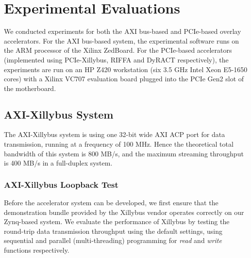 \section{Experimental Evaluations}
We conducted experiments for both the AXI bus-based and PCIe-based overlay accelerators.  
For the AXI bus-based system, the experimental software runs on the ARM processor of the Xilinx ZedBoard. 
For the PCIe-based accelerators (implemented using PCIe-Xillybus, RIFFA and DyRACT respectively), the experiments are run on an HP Z420 workstation (six 3.5 GHz Intel Xeon E5-1650 cores) with a Xilinx VC707 evaluation board plugged into the PCIe Gen2 slot of the motherboard. 

\subsection{AXI-Xillybus System}
The AXI-Xillybus system is using one 32-bit wide AXI ACP port for data transmission, running at a frequency of 100 MHz. 
Hence the theoretical total bandwidth of this system is 800 MB/s, and the maximum streaming throughput is 400 MB/s in a full-duplex system. 

\subsubsection{AXI-Xillybus Loopback Test}
Before the accelerator system can be developed, we first ensure that the demonstration bundle provided by the Xillybus vendor operates correctly on our Zynq-based system. 
We evaluate the performance of Xillybus by testing the round-trip data transmission throughput using the default settings, using sequential and parallel (multi-threading) programming for \textit{read} and \textit{write} functions respectively. 

